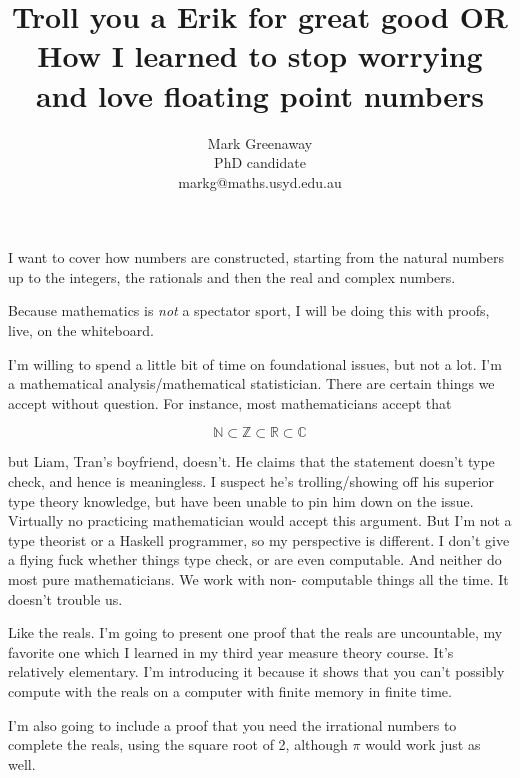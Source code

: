 \documentclass{beamer}
\title{Troll you a Erik for great good OR How I learned to stop worrying and love floating point numbers}
\author{Mark Greenaway\\PhD candidate\\markg@maths.usyd.edu.au}
\begin{document}
\begin{frame}
\maketitle
\end{frame}

\begin{frame}

I want to cover how numbers are constructed, starting from the natural numbers up to the integers, the
rationals and then the real and complex numbers.

Because mathematics is \emph{not} a spectator sport, I will be doing this with proofs, live, on the
whiteboard.

I'm willing to spend a little bit of time on foundational issues, but not a lot. I'm a mathematical
analysis/mathematical statistician. There are certain things we accept without question. For instance, most
mathematicians accept that

\begin{equation*}
\mathbb{N} \subset \mathbb{Z} \subset \mathbb{R} \subset \mathbb{C}
\end{equation*}

but Liam, Tran's boyfriend, doesn't. He claims that the statement doesn't type check, and hence is
meaningless. I suspect he's trolling/showing off his superior type theory knowledge, but have been unable to
pin him down on the issue. Virtually no practicing mathematician would accept this argument. But I'm not a
type theorist or a Haskell programmer, so my perspective is different. I don't give a flying fuck whether
things type check, or are even computable. And neither do most pure mathematicians. We work with non-
computable things all the time. It doesn't trouble us.

Like the reals. I'm going to present one proof that the reals are uncountable, my favorite one which I learned
in my third year measure theory course. It's relatively elementary. I'm introducing it because it shows that
you can't possibly compute with the reals on a computer with finite memory in finite time.

I'm also going to include a proof that you need the irrational numbers to complete the reals, using the
square root of 2, although $\pi$ would work just as well.


\end{frame}
\end{document}
